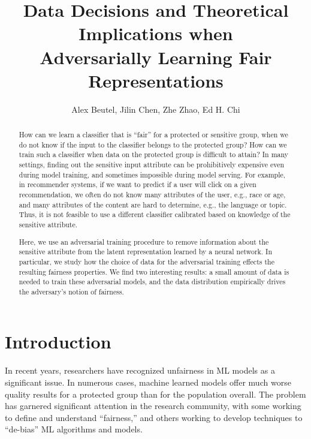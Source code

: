 \documentclass[sigconf,9pt]{acmart}
\begin{document}
\title{Data Decisions and Theoretical Implications when\\Adversarially Learning Fair Representations}


\author{Alex Beutel, Jilin Chen, Zhe Zhao, Ed H. Chi}

\begin{abstract}
How can we learn a classifier that is ``fair'' for a protected or sensitive group, when we do not know if the input to the classifier belongs to the protected group?  How can we train such a classifier when data on the protected group is difficult to attain?  In many settings, finding out the sensitive input attribute can be prohibitively expensive even during model training, and sometimes impossible during model serving.  For example, in recommender systems, if we want to predict if a user will click on a given recommendation, we often do not know many attributes of the user, e.g., race or age, and many attributes of the content are hard to determine, e.g., the language or topic.  Thus, it is not feasible to use a different classifier calibrated based on knowledge of the sensitive attribute.

Here, we use an adversarial training procedure to remove information about the sensitive attribute from the latent representation learned by a neural network.  
In particular, we study how the choice of data for the adversarial training effects the resulting fairness properties.  We find two interesting results: a small amount of data is needed to train these adversarial models, and the data distribution empirically drives the adversary's notion of fairness.
\end{abstract}

\maketitle

\section{Introduction}

In recent years, researchers have recognized unfairness in ML models as a significant issue.  In numerous cases, machine learned models offer much worse quality results for a protected group than for the population overall.
The problem has garnered significant attention in the research community, with some working to define and understand ``fairness,'' and others working to develop techniques to ``de-bias'' ML algorithms and models.
\end{document}
